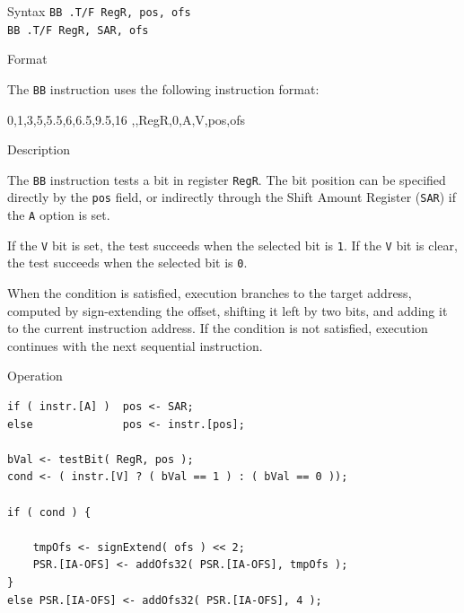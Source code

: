 \pagebreak
{}

\begin{iPageDescEntry}{Syntax} 
  \texttt{BB .T/F RegR, pos, ofs} \\
  \texttt{BB .T/F RegR, SAR, ofs}
\end{iPageDescEntry}

\begin{iPageDescEntry}{Format}

The \texttt{BB} instruction uses the following instruction format: \\

\begin{flushleft}
  \drawInstrFormat
    {0,1,3,5,5.5,6,6.5,9.5,16}
    {\OpCodeGrpBR,\OpCodeBB,RegR,0,A,V,pos,ofs}
\end{flushleft}

\end{iPageDescEntry}

\begin{iPageDescEntry}{Description}

The \texttt{BB} instruction tests a bit in register \texttt{RegR}.  
The bit position can be specified directly by the \texttt{pos} field,  
or indirectly through the Shift Amount Register (\texttt{SAR}) if the \texttt{A} option is set.  

If the \texttt{V} bit is set, the test succeeds when the selected bit is \texttt{1}.  
If the \texttt{V} bit is clear, the test succeeds when the selected bit is \texttt{0}.  

When the condition is satisfied, execution branches to the target address,  
computed by sign-extending the offset, shifting it left by two bits,  
and adding it to the current instruction address. If the condition is not satisfied, execution continues with the next sequential instruction.  

\end{iPageDescEntry}

\begin{iPageDescOpEntry}{Operation}
\begin{lstlisting}[style=iPageOpStyle]
if ( instr.[A] )  pos <- SAR;
else              pos <- instr.[pos];

bVal <- testBit( RegR, pos );
cond <- ( instr.[V] ? ( bVal == 1 ) : ( bVal == 0 ));

if ( cond ) {

    tmpOfs <- signExtend( ofs ) << 2;
    PSR.[IA-OFS] <- addOfs32( PSR.[IA-OFS], tmpOfs );
}
else PSR.[IA-OFS] <- addOfs32( PSR.[IA-OFS], 4 );
\end{lstlisting}
\end{iPageDescOpEntry}

